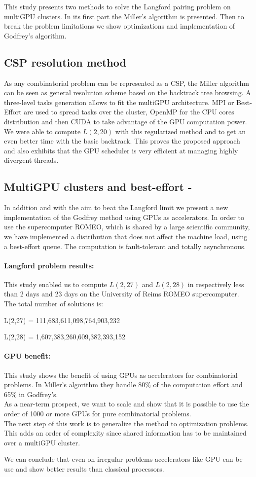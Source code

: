 This study presents two methods to solve the Langford pairing problem on multiGPU clusters. 
In its first part the Miller's algorithm is presented. 
Then to break the problem limitations we show optimizations and implementation of Godfrey's algorithm.

\subsection{CSP resolution method}
As any combinatorial problem can be represented as a CSP, the Miller algorithm can be seen as general resolution scheme based on the backtrack tree browsing. 
A three-level tasks generation allows to fit the multiGPU architecture. 
MPI or Best-Effort are used to spread tasks over the cluster, OpenMP for the CPU cores distribution and then CUDA to take advantage of the GPU computation power.
We were able to compute $L(2,20)$ with this regularized method and to get an even better time with the basic backtrack. 
This proves the proposed approach and also exhibits that the GPU scheduler is very efficient at managing highly divergent threads.

\subsection{MultiGPU clusters and best-effort -}
In addition and with the aim to beat the Langford limit we present a new implementation of the Godfrey method using GPUs as accelerators. In order to use the supercomputer ROMEO, which is shared by a large scientific community, we have implemented a distribution that does not affect the machine load, using a best-effort queue. The computation is fault-tolerant and totally asynchronous.

\paragraph{Langford problem results: }
This study enabled us to compute $L(2,27)$ and $L(2,28)$ in respectively less than 2 days and 23 days on the University of Reims ROMEO supercomputer. The total number of solutions is: 

\hspace{3cm} L(2,27) = 111,683,611,098,764,903,232

\hspace{3cm} L(2,28) = 1,607,383,260,609,382,393,152

\paragraph{GPU benefit: }
This study shows the benefit of using GPUs as accelerators for combinatorial problems. 
In Miller's algorithm they handle 80\% of the computation effort and 65\% in Godfrey's.\\
As a near-term prospect, we want to scale and show that it is possible to use the order of 1000 or more GPUs for pure combinatorial problems.\\
The next step of this work is to generalize the method to optimization problems. 
This adds an order of complexity since shared information has to be maintained over a multiGPU cluster. 

We can conclude that even on irregular problems accelerators like GPU can be use and show better results than classical processors. 
 
